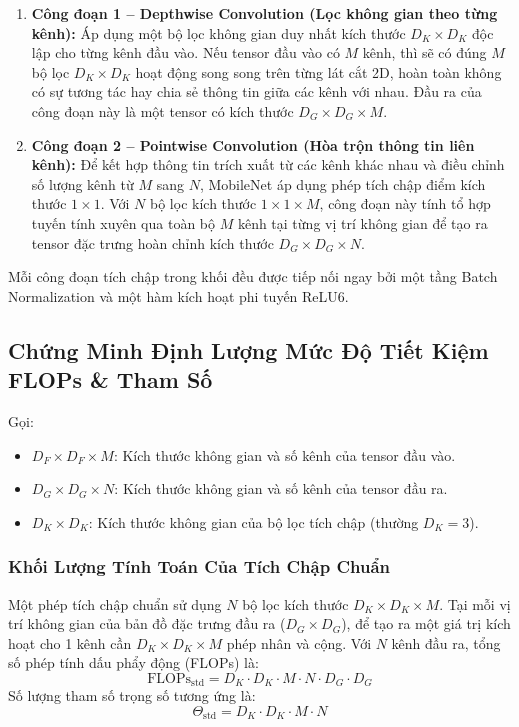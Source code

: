 \documentclass[12pt,a4paper]{report}
\begin{document}
\begin{enumerate}[leftmargin=*]
    \item \textbf{Công đoạn 1 -- Depthwise Convolution (Lọc không gian theo từng kênh):}
    Áp dụng một bộ lọc không gian duy nhất kích thước $D_K \times D_K$ độc lập cho từng kênh đầu vào. Nếu tensor đầu vào có $M$ kênh, thì sẽ có đúng $M$ bộ lọc $D_K \times D_K$ hoạt động song song trên từng lát cắt 2D, hoàn toàn không có sự tương tác hay chia sẻ thông tin giữa các kênh với nhau. Đầu ra của công đoạn này là một tensor có kích thước $D_G \times D_G \times M$.
    \item \textbf{Công đoạn 2 -- Pointwise Convolution (Hòa trộn thông tin liên kênh):}
    Để kết hợp thông tin trích xuất từ các kênh khác nhau và điều chỉnh số lượng kênh từ $M$ sang $N$, MobileNet áp dụng phép tích chập điểm kích thước $1 \times 1$. Với $N$ bộ lọc kích thước $1 \times 1 \times M$, công đoạn này tính tổ hợp tuyến tính xuyên qua toàn bộ $M$ kênh tại từng vị trí không gian để tạo ra tensor đặc trưng hoàn chỉnh kích thước $D_G \times D_G \times N$.
\end{enumerate}

Mỗi công đoạn tích chập trong khối đều được tiếp nối ngay bởi một tầng Batch Normalization và một hàm kích hoạt phi tuyến ReLU6.

\subsection{Chứng Minh Định Lượng Mức Độ Tiết Kiệm FLOPs \& Tham Số}
Gọi:
\begin{itemize}
    \item $D_F \times D_F \times M$: Kích thước không gian và số kênh của tensor đầu vào.
    \item $D_G \times D_G \times N$: Kích thước không gian và số kênh của tensor đầu ra.
    \item $D_K \times D_K$: Kích thước không gian của bộ lọc tích chập (thường $D_K = 3$).
\end{itemize}

\subsubsection{Khối Lượng Tính Toán Của Tích Chập Chuẩn}
Một phép tích chập chuẩn sử dụng $N$ bộ lọc kích thước $D_K \times D_K \times M$. Tại mỗi vị trí không gian của bản đồ đặc trưng đầu ra ($D_G \times D_G$), để tạo ra một giá trị kích hoạt cho 1 kênh cần $D_K \times D_K \times M$ phép nhân và cộng. Với $N$ kênh đầu ra, tổng số phép tính dấu phẩy động (FLOPs) là:
\begin{equation}
    \text{FLOPs}_{\text{std}} = D_K \cdot D_K \cdot M \cdot N \cdot D_G \cdot D_G
\end{equation}
Số lượng tham số trọng số tương ứng là:
\begin{equation}
    \Theta_{\text{std}} = D_K \cdot D_K \cdot M \cdot N
\end{equation}
\end{document}
